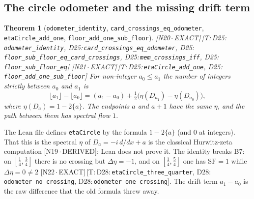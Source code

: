 \documentclass[11pt]{article}
\newtheorem{theorem}{Theorem}
\theoremstyle{definition}
\newcommand{\lean}[1]{\texttt{\small #1}}
\newcommand{\dtag}[1]{#1}
\begin{document}
\subsection{The circle odometer and the missing drift term}
\begin{theorem}[\lean{odometer\_identity}, \lean{card\_crossings\_eq\_odometer}, \lean{etaCircle\_add\_one}, \lean{floor\_add\_one\_sub\_floor}]\dtag{\textsf{\small[N20\,$\cdot$\,EXACT]}\,\textsf{\small[T:\,D25:\,\lean{odometer\_\allowbreak{}identity}, D25:\,\lean{card\_\allowbreak{}crossings\_\allowbreak{}eq\_\allowbreak{}odometer}, D25:\,\lean{floor\_\allowbreak{}sub\_\allowbreak{}floor\_\allowbreak{}eq\_\allowbreak{}card\_\allowbreak{}crossings}, D25:\,\lean{mem\_\allowbreak{}crossings\_\allowbreak{}iff}, D25:\,\lean{floor\_\allowbreak{}sub\_\allowbreak{}floor\_\allowbreak{}eq}]} \textsf{\small[N21\,$\cdot$\,EXACT]}\,\textsf{\small[T:\,D25:\,\lean{etaCircle\_\allowbreak{}add\_\allowbreak{}one}, D25:\,\lean{floor\_\allowbreak{}add\_\allowbreak{}one\_\allowbreak{}sub\_\allowbreak{}floor}]}}
For non-integer $a_0\le a_1$ the number of integers strictly between $a_0$ and $a_1$ is
\[ \lfloor a_1\rfloor-\lfloor a_0\rfloor=(a_1-a_0)+\tfrac12\bigl(\eta(D_{a_1})-\eta(D_{a_0})\bigr), \]
where $\eta(D_a)=1-2\{a\}$. The endpoints $a$ and $a+1$ have the same $\eta$, and the path between them has spectral flow $1$.
\end{theorem}
The Lean file defines \lean{etaCircle} by the formula $1-2\{a\}$ (and $0$ at integers). That this is the spectral $\eta$ of $D_a=-i\,d/dx+a$ is the classical Hurwitz-zeta computation \dtag{\textsf{\small[N19\,$\cdot$\,DERIVED]}}; Lean does not prove it. The identity breaks B7: on $[\tfrac14,\tfrac34]$ there is no crossing but $\Delta\eta=-1$, and on $[\tfrac14,\tfrac54]$ one has $\mathrm{SF}=1$ while $\Delta\eta=0\neq2$ \dtag{\textsf{\small[N22\,$\cdot$\,EXACT]}\,\textsf{\small[T:\,D28:\,\lean{etaCircle\_\allowbreak{}three\_\allowbreak{}quarter}, D28:\,\lean{odometer\_\allowbreak{}no\_\allowbreak{}crossing}, D28:\,\lean{odometer\_\allowbreak{}one\_\allowbreak{}crossing}]}}. The drift term $a_1-a_0$ is the raw difference that the old formula threw away.
\end{document}
